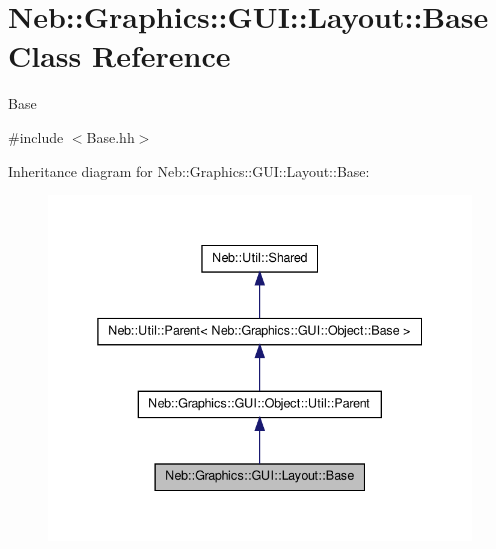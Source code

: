 \hypertarget{classNeb_1_1Graphics_1_1GUI_1_1Layout_1_1Base}{\section{\-Neb\-:\-:\-Graphics\-:\-:\-G\-U\-I\-:\-:\-Layout\-:\-:\-Base \-Class \-Reference}
\label{classNeb_1_1Graphics_1_1GUI_1_1Layout_1_1Base}
}


\-Base  




{\ttfamily \#include $<$\-Base.\-hh$>$}



\-Inheritance diagram for \-Neb\-:\-:\-Graphics\-:\-:\-G\-U\-I\-:\-:\-Layout\-:\-:\-Base\-:\nopagebreak
\begin{figure}[H]
\begin{center}
\leavevmode
\includegraphics[width=338pt]{classNeb_1_1Graphics_1_1GUI_1_1Layout_1_1Base__inherit__graph}
\end{center}
\end{figure}


